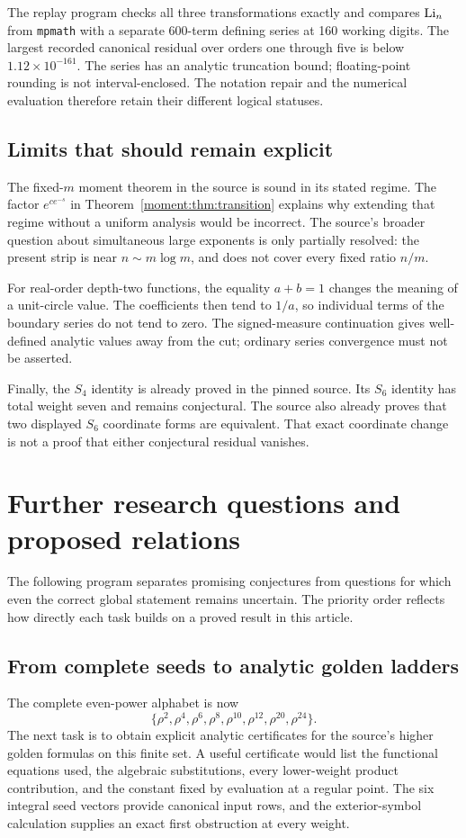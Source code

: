 The replay program checks all three transformations exactly and
compares \(\operatorname{Li}_n\) from \texttt{mpmath} with a separate 600-term
defining series at 160 working digits. The largest recorded canonical
residual over orders one through five is below
\(1.12\times10^{-161}\). The series has an analytic truncation
bound; floating-point rounding is not interval-enclosed.
The notation repair and the numerical evaluation therefore retain
their different logical statuses.

\subsection{Limits that should remain explicit}
The fixed-\(m\) moment theorem in the source is sound in its stated
regime. The factor \(e^{c e^{-s}}\) in
Theorem~\ref{moment:thm:transition} explains why extending that regime
without a uniform analysis would be incorrect. The source's broader
question about simultaneous large exponents is only partially resolved:
the present strip is near \(n\sim m\log m\), and does not cover every
fixed ratio \(n/m\).

For real-order depth-two functions, the equality \(a+b=1\) changes the
meaning of a unit-circle value. The coefficients then tend to \(1/a\),
so individual terms of the boundary series do not tend to zero.
The signed-measure continuation gives well-defined analytic values
away from the cut; ordinary series convergence must not be asserted.

Finally, the \(S_4\) identity is already proved in the pinned source.
Its \(S_6\) identity has total weight seven and remains conjectural.
The source also already proves that two displayed \(S_6\) coordinate
forms are equivalent. That exact coordinate change is not a proof
that either conjectural residual vanishes.

\section{Further research questions and proposed relations}
\label{future:sec}
The following program separates promising conjectures from questions
for which even the correct global statement remains uncertain.
The priority order reflects how directly each task builds on a
proved result in this article.

\subsection{From complete seeds to analytic golden ladders}
The complete even-power alphabet is now
\[
 \{\rho^2,\rho^4,\rho^6,\rho^8,\rho^{10},
       \rho^{12},\rho^{20},\rho^{24}\}.
\]
The next task is to obtain explicit analytic certificates for the
source's higher golden formulas on this finite set. A useful
certificate would list the functional equations used, the algebraic
substitutions, every lower-weight product contribution, and the
constant fixed by evaluation at a regular point. The six integral
seed vectors provide canonical input rows, and the exterior-symbol
calculation supplies an exact first obstruction at every weight.

